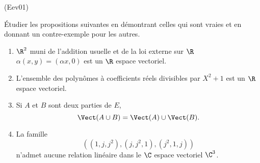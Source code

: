 \begin{tiny}(Eev01)\end{tiny}
\'Etudier les propositions suivantes en d{\'e}montrant celles qui sont
vraies et en donnant un contre-exemple pour les autres.
  \begin{enumerate}
    \item $\R^{2}$ muni de l'addition usuelle et de la loi externe
sur $\R$ $\alpha (x,y)=(\alpha x,0)$ est un $\R$ espace
vectoriel.
    \item L'ensemble des polyn{\^o}mes {\`a} coefficients r{\'e}els
divisibles par $X^{2}+1$ est un $\R$ espace vectoriel.
    \item  Si $A$ et $B$ sont deux parties de $E$,
\[
\Vect(A\cup B) = \Vect(A)\cup \Vect(B).
\]
    \item La famille $$\left( (1,j,j^{2}),(j,j^{2},1),(j^{2},1,j)\right) $$
n'admet aucune relation lin{\'e}aire dans le $\C$ espace vectoriel $\C^{3}$.
  \end{enumerate}
